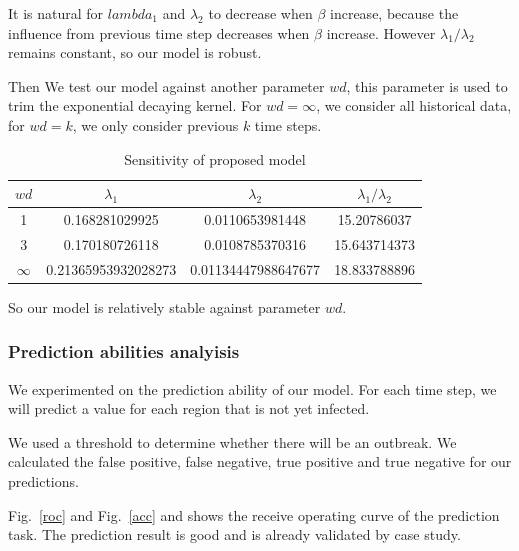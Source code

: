 \documentclass[11pt]{article}
\begin{document}
It is natural for $lambda_1$ and $\lambda_2$ to decrease when $\beta$ increase, because the influence from previous time step decreases when $\beta$ increase. However $\lambda_1 /\lambda_2 $ remains constant, so our model is robust.

Then We test our model against another parameter $wd$, this parameter is used to trim the exponential decaying kernel. For $wd = \infty$, we consider all historical data, for $wd = k$, we only consider previous $k$ time steps.





\begin{table}[hbtp]
\begin{center}
\begin{tabular}{|c|c|c|c|}
\hline
$wd$ & $\lambda_1$ & $\lambda_2 $ & $\lambda_1 /\lambda_2 $  \\
\hline
1 &0.168281029925 &0.0110653981448 & 15.20786037\\
\hline 
3 & 0.170180726118 & 0.0108785370316 & 15.643714373\\
\hline 
$\infty$  & 0.21365953932028273 & 0.01134447988647677 & 18.833788896\\ 
\hline 




\end{tabular}
\end{center}
\caption{Sensitivity of proposed model }
\label{testtable}
\end{table}

So our model is relatively stable against parameter $wd$.

\subsubsection{Prediction abilities analyisis}

We experimented on the prediction ability of our model. For each time step, we will predict a value for each region that is not yet infected. 

We used a threshold to determine whether there will be an outbreak. We calculated the false positive, false negative, true positive and true negative for our predictions. 

Fig.~\ref{roc} and Fig.~\ref{acc} and shows the receive operating curve of the prediction task. The prediction result is good and is already validated by case study. 
\end{document}
